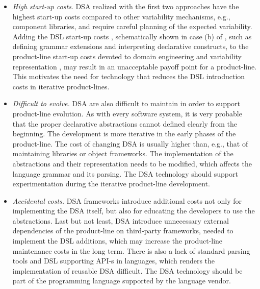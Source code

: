 \begin{itemize}
\item \textit{High start-up costs}. DSA realized with the first two approaches have the highest start-up costs compared to other variability mechanisms, e.g., component libraries, and require careful planning of the expected variability. Adding the DSL start-up costs \cite{hudak98modular}, schematically shown in case (b) of , such as defining grammar extensions and interpreting declarative
constructs, to the product-line start-up costs devoted to domain engineering \cite{harsu.2001} and variability representation \cite{harsu.2001}, may result in an unacceptable payoff point for a product-line. This motivates the need for technology that reduces the DSL introduction costs in iterative product-lines.

\item \textit{Difficult to evolve.} DSA are also difficult to maintain in order to support product-line evolution. As with every software system, it is very probable that the proper declarative abstractions cannot defined clearly from the beginning. The development is more iterative in the early phases of the product-line. The cost of changing DSA is usually higher than, e.g., that of maintaining libraries or object frameworks. The implementation of the abstractions and their representation needs to be modified, which affects the language grammar and its parsing. The DSA technology should support experimentation during the iterative product-line development.

\item \textit{Accidental costs.} DSA frameworks introduce additional costs not only for implementing the DSA itself, but also for educating the developers to use the abstractions. Last but not least, DSA introduce unnecessary external dependencies of the product-line on third-party frameworks, needed to implement the DSL additions, which may increase the product-line maintenance costs in the long term. There is also a lack of standard parsing tools and DSL supporting API-s in languages, which renders the implementation of reusable DSA difficult. The DSA technology should be part of the programming language supported by the language vendor.

\end{itemize}

